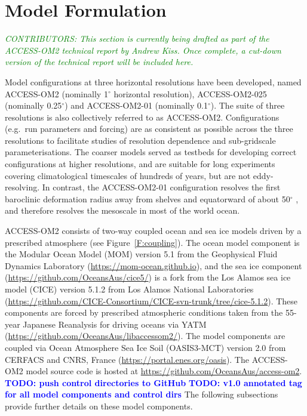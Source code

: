 \documentclass[gmd, manuscript]{copernicus}
\newcommand{\CONTRIBUTORS}[1]{\textcolor{green}{\textsf{\textsl{CONTRIBUTORS: #1}}}}
\newcommand{\TODO}[1]{\textcolor{blue}{\textsf{\textbf{TODO: #1}}}}
\begin{document}
\section{Model Formulation}
\CONTRIBUTORS{This section is currently being drafted as part of the ACCESS-OM2 technical report by Andrew Kiss. Once complete, a cut-down version of the technical report will be included here.}

Model configurations at three horizontal resolutions have been developed, named ACCESS-OM2 (nominally 1$^\circ$ horizontal resolution), ACCESS-OM2-025 (nominally 0.25$^\circ$) and ACCESS-OM2-01 (nominally 0.1$^\circ$).
The suite of three resolutions is also collectively referred to as ACCESS-OM2.
Configurations (e.g.\ run parameters and forcing) are as consistent as possible across the three resolutions to facilitate studies of resolution dependence and sub-gridscale parameterisations. 
The coarser models served as testbeds for developing correct configurations at higher resolutions, and are suitable for long experiments covering climatological timescales of hundreds of years, but are not eddy-resolving.
In contrast, the ACCESS-OM2-01 configuration resolves the first baroclinic deformation radius away from shelves and equatorward of about 50$^\circ$ \citep{Hallberg2013a}, and therefore resolves the mesoscale in most of the world ocean. 

ACCESS-OM2 consists of two-way coupled ocean and sea ice models driven by a prescribed atmosphere (see Figure~\ref{F:coupling}).
The ocean model component is the Modular Ocean Model (MOM) version 5.1 from the Geophysical Fluid Dynamics Laboratory (\url{https://mom-ocean.github.io}), and the sea ice component (\url{https://github.com/OceansAus/cice5/}) is a fork from the Los Alamos sea ice model (CICE) version 5.1.2 from Los Alamos National Laboratories (\url{https://github.com/CICE-Consortium/CICE-svn-trunk/tree/cice-5.1.2}).
These components are forced by prescribed atmospheric conditions taken from the 55-year Japanese Reanalysis for driving oceans \citep[JRA55-do,][]{TsujinoETAL2018a} via YATM (\url{https://github.com/OceansAus/libaccessom2/}).
The model components are coupled via Ocean Atmosphere Sea Ice Soil (OASIS3-MCT) version 2.0 from CERFACS and CNRS, France (\url{https://portal.enes.org/oasis}).
The ACCESS-OM2 model source code is hosted at \url{https://github.com/OceansAus/access-om2}.
\TODO{push control directories to GitHub}
\TODO{v1.0 annotated tag for all model components and control dirs}
The following subsections provide further details on these model components.
\end{document}

